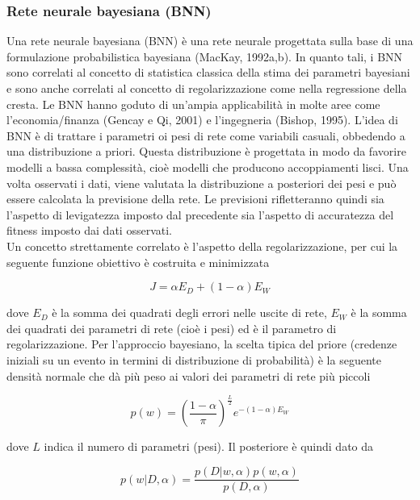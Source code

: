 \documentclass[12pt,a4paper]{report}
\begin{document}
\subsubsection{Rete neurale bayesiana (BNN)}
Una rete neurale bayesiana (BNN) è una rete neurale progettata sulla base di una formulazione probabilistica bayesiana (MacKay, 1992a,b). In quanto tali, i BNN sono correlati al concetto di statistica classica della stima dei parametri bayesiani e sono anche correlati al concetto di regolarizzazione come nella regressione della cresta. Le BNN hanno goduto di un'ampia applicabilità in molte aree come l'economia/finanza (Gencay e Qi, 2001) e l'ingegneria (Bishop, 1995). L'idea di BNN è di trattare i parametri oi pesi di rete come variabili casuali, obbedendo a una distribuzione a priori. Questa distribuzione è progettata in modo da favorire modelli a bassa complessità, cioè modelli che producono accoppiamenti lisci. Una volta osservati i dati, viene valutata la distribuzione a posteriori dei pesi e può essere calcolata la previsione della rete. Le previsioni rifletteranno quindi sia l'aspetto di levigatezza imposto dal precedente sia l'aspetto di accuratezza del fitness imposto dai dati osservati.\\
Un concetto strettamente correlato è l'aspetto della regolarizzazione, per cui la seguente funzione obiettivo è costruita e minimizzata

\begin{equation}
{\displaystyle J =\alpha E_D + (1 - \alpha)E_W}
\end{equation}

dove $E_D$ è la somma dei quadrati degli errori nelle uscite di rete, $E_W$ è la somma dei quadrati dei parametri di rete (cioè i pesi) ed è il parametro di regolarizzazione.
Per l'approccio bayesiano, la scelta tipica del priore (credenze iniziali su un evento in termini di distribuzione di probabilità) è la seguente densità normale che dà più peso ai valori dei parametri di rete più piccoli

\begin{equation}
{\displaystyle p(w) = \left( \frac{1 - \alpha}{\pi} \right)^{\frac{L}{2}} e^{-(1 - \alpha)E_W}}
\end{equation}

dove $L$ indica il numero di parametri (pesi). Il posteriore è quindi dato da

\begin{equation}
{ \displaystyle p(w \vert D, \alpha) = \frac{p(D \vert w, \alpha)p(w, \alpha)}{p(D, \alpha)} }
\end{equation}
\end{document}
